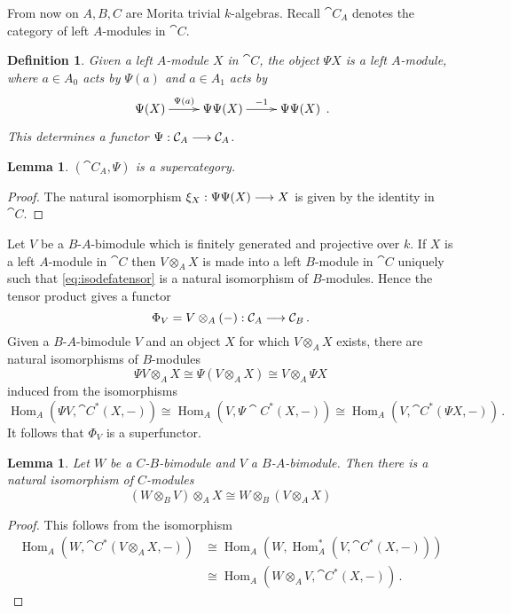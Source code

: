 \documentclass[english,letter paper,12pt,leqno]{article}
\newtheorem{lemma}[theorem]{Lemma}
\theoremstyle{example}
\newtheorem{definition}[theorem]{Definition}
\numberwithin{equation}{section}
\def\Hom{\operatorname{Hom}}
\begin{document}
From now on $A,B,C$ are Morita trivial $k$-algebras. Recall $\cat{C}_A$ denotes the category of left $A$-modules in $\cat{C}$.

\begin{definition}\label{defn:psimodule} Given a left $A$-module $X$ in $\cat{C}$, the object $\Psi X$ is a left $A$-module, where $a \in A_0$ acts by $\Psi(a)$ and $a \in A_1$ acts by
\[
\xymatrix{
\Psi (X) \ar[r]^-{\Psi(a)} & \Psi \Psi (X) \ar[r]^-{-1} & \Psi \Psi (X)
}\,.
\]
This determines a functor $\Psi: \mathcal{C}_A \longrightarrow \mathcal{C}_A$.
\end{definition}

\begin{lemma} $(\cat{C}_A, \Psi)$ is a supercategory.
\end{lemma}
\begin{proof}
The natural isomorphism $\xi_X: \Psi \Psi (X) \longrightarrow X$ is given by the identity in $\cat{C}$.
\end{proof}

Let $V$ be a $B$-$A$-bimodule which is finitely generated and projective over $k$. If $X$ is a left $A$-module in $\cat{C}$ then $V \otimes_A X$ is made into a left $B$-module in $\cat{C}$ uniquely such that \eqref{eq:isodefatensor} is a natural isomorphism of $B$-modules. Hence the tensor product gives a functor
\[
\Phi_V = V \otimes_A (-): \mathcal{C}_A \longrightarrow \mathcal{C}_B\,.
\]
Given a $B$-$A$-bimodule $V$ and an object $X$ for which $V \otimes_A X$ exists, there are natural isomorphisms of $B$-modules
\[
\Psi V \otimes_A X \cong \Psi(V \otimes_A X) \cong V \otimes_A \Psi X
\]
induced from the isomorphisms
\[
\Hom_A( \Psi V, \cat{C}^*(X, -)) \cong \Hom_A( V, \Psi \cat{C}^*(X, -) ) \cong \Hom_A( V, \cat{C}^*(\Psi X, -))\,.
\]
It follows that $\Phi_V$ is a superfunctor.

\begin{lemma}\label{lemma:assoctensor} Let $W$ be a $C$-$B$-bimodule and $V$ a $B$-$A$-bimodule. Then there is a natural isomorphism of $C$-modules
\[
(W \otimes_B V) \otimes_A X \cong W \otimes_B ( V \otimes_A X )
\]
\end{lemma}
\begin{proof}
This follows from the isomorphism
\begin{align*}
\Hom_A(W, \cat{C}^*(V \otimes_A X, -)) &\cong \Hom_A( W, \Hom_A^*(V, \cat{C}^*(X, -)))\\
&\cong \Hom_A(W \otimes_A V, \cat{C}^*(X, -))\,.
\end{align*}
\end{proof}
\end{document}
